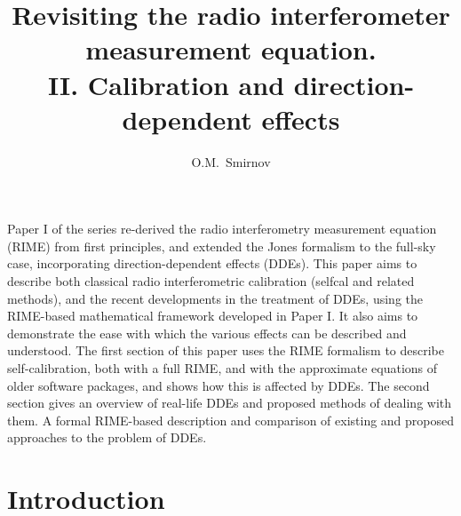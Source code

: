 \documentclass{aa}
\begin{document}
\title{Revisiting the radio interferometer measurement equation.\\II. Calibration and direction-dependent effects}

\author{O.M.\ Smirnov}


\date{}


\abstract%
{Paper I of the series re-derived the radio interferometry measurement equation (RIME) from first principles, and extended the Jones
formalism to the full-sky case, incorporating direction-dependent effects (DDEs).}
{This paper aims to describe both classical radio interferometric calibration (selfcal and related methods), and the
recent developments in the treatment of DDEs, using the RIME-based mathematical framework developed in Paper I. It also
aims to demonstrate the ease with which the various effects can be described and understood.}
{The first section of this paper uses the RIME formalism to describe self-calibration, both with 
a full RIME, and with the approximate equations of older software packages, and shows how this is affected 
by DDEs. The second section gives an overview of real-life DDEs and proposed methods of dealing with them.}
{A formal RIME-based description and comparison of existing and proposed approaches to the problem of DDEs.}
{}


\maketitle

\section*{Introduction}
\end{document}

